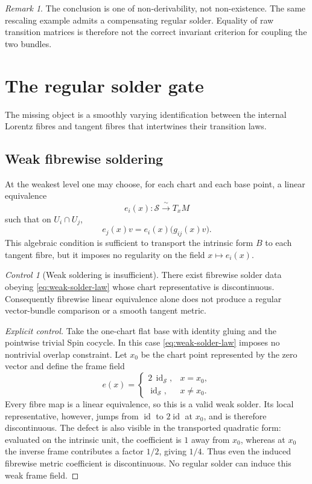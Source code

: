 \documentclass[11pt,a4paper]{article}
\theoremstyle{definition}
\theoremstyle{remark}
\newtheorem{remark}[theorem]{Remark}
\newtheorem{control}[theorem]{Control}
\newcommand{\Smodel}{\mathcal{S}}
\newcommand{\id}{\operatorname{id}}
\begin{document}
\begin{remark}
The conclusion is one of non-derivability, not non-existence.  The same
rescaling example admits a compensating regular solder.  Equality of raw
transition matrices is therefore not the correct invariant criterion for
coupling the two bundles.
\end{remark}

\clearpage
\section{The regular solder gate}
\label{sec:solder}

The missing object is a smoothly varying identification between the
internal Lorentz fibres and tangent fibres that intertwines their
transition laws.

\subsection{Weak fibrewise soldering}

At the weakest level one may choose, for each chart and each base point, a
linear equivalence
\[
   e_i(x):\Smodel\xrightarrow{\;\sim\;}T_xM
\tag{7.1}
\]
such that on \(U_i\cap U_j\),
\[
   e_j(x)v
   =
   e_i(x)\bigl(g_{ij}(x)v\bigr).
\tag{7.2}\label{eq:weak-solder-law}
\]
This algebraic condition is sufficient to transport the intrinsic form
\(B\) to each tangent fibre, but it imposes no regularity on the field
\(x\mapsto e_i(x)\).

\begin{control}[Weak soldering is insufficient]
\label{control:weak}
There exist fibrewise solder data obeying \eqref{eq:weak-solder-law} whose chart
representative is discontinuous.  Consequently fibrewise linear
equivalence alone does not produce a regular vector-bundle comparison or
a smooth tangent metric.
\end{control}

\begin{proof}[Explicit control]
Take the one-chart flat base with identity gluing and the pointwise trivial
Spin cocycle.  In this case \eqref{eq:weak-solder-law} imposes no
nontrivial overlap constraint.  Let \(x_0\) be the chart point represented
by the zero vector and define the frame field
\[
 e(x)=
 \begin{cases}
   2\,\id_{\Smodel}, & x=x_0,\\
   \id_{\Smodel}, & x\ne x_0.
 \end{cases}
\tag{7.2a}\label{eq:bad-solder}
\]
Every fibre map is a linear equivalence, so this is a valid weak solder.
Its local representative, however, jumps from \(\id\) to \(2\id\) at
\(x_0\), and is therefore discontinuous.  The defect is also visible in
the transported quadratic form: evaluated on the intrinsic unit, the
coefficient is \(1\) away from \(x_0\), whereas at \(x_0\) the inverse
frame contributes a factor \(1/2\), giving \(1/4\).  Thus even the induced
fibrewise metric coefficient is discontinuous.  No regular solder can
induce this weak frame field.
\end{proof}
\end{document}
